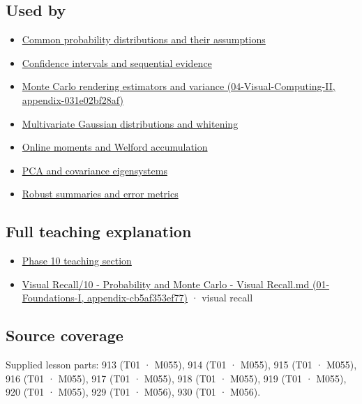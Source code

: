 \subsection{Used by}\label{appendix-54c383df9992-used-by}

\begin{itemize}
\tightlist
\item
  \hyperref[appendix-a2360b435383]{Common probability distributions and their assumptions}
\item
  \hyperref[appendix-c83016554b1e]{Confidence intervals and sequential evidence}
\item
  \href{../04-Visual-Computing-II/main.pdf\#nameddest=appendix-031e02bf28af}{Monte Carlo rendering estimators and variance (04-Visual-Computing-II, appendix-031e02bf28af)}
\item
  \hyperref[appendix-12bbe185dbe5]{Multivariate Gaussian distributions and whitening}
\item
  \hyperref[appendix-33237f0f618b]{Online moments and Welford accumulation}
\item
  \hyperref[appendix-ad175ef3c5bf]{PCA and covariance eigensystems}
\item
  \hyperref[appendix-bcc44e9d3d02]{Robust summaries and error metrics}
\end{itemize}

\subsection{Full teaching explanation}\label{appendix-54c383df9992-full-teaching-explanation}

\begin{itemize}
\tightlist
\item
  \hyperref[02-foundations-ii-ch023-expected-values-describe-centers-covariance-describes-dependence]{Phase 10 teaching section}
\item
  \href{../01-Foundations-I/main.pdf\#nameddest=appendix-cb5af353ef77}{Visual Recall/10 - Probability and Monte Carlo - Visual Recall.md (01-Foundations-I, appendix-cb5af353ef77)} · visual recall
\end{itemize}

\subsection{Source coverage}\label{appendix-54c383df9992-source-coverage}

Supplied lesson parts: 913 (T01 · M055), 914 (T01 · M055), 915 (T01 · M055), 916 (T01 · M055), 917 (T01 · M055), 918 (T01 · M055), 919 (T01 · M055), 920 (T01 · M055), 929 (T01 · M056), 930 (T01 · M056).

